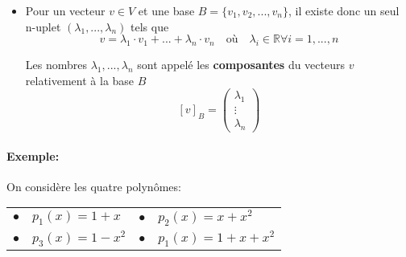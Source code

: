 \documentclass[
    11pt,
    a4paper,
    oneside,
    headinlcude, footinclude,
    twoside,
]{report}
\newcommand{\myVector}[3]{\begin{pmatrix}#1\\#2\\#3\end{pmatrix}}
\begin{document}
\begin{itemize}
    \item Pour un vecteur $v \in V $ et une base $ B = \{v_{1}, v_{2}, ..., v_{n}\}$,
        il existe donc un seul n-uplet $(\lambda_{1}, ..., \lambda_{n})$ tels
        que 
        $$v = \lambda_{1} \cdot v_{1} + ... + \lambda_{n}\cdot v_{n} \quad \text{où}
        \quad \lambda_{i} \in \mathbb{R} \forall i = 1, ..., n$$

        Les nombres $\lambda_{1}, ..., \lambda_{n}$ sont appelé les \textbf{composantes} du
        vecteurs $v$ relativement à la base $B$ $$[v]_{B} = \myVector
        {\lambda_{1}}{\vdots}{\lambda_{n}}$$
\end{itemize}

\paragraph{Exemple:}

On considère les quatre polynômes:

\begin{center}
    \begin{tabular}{ll}
        $\bullet \quad p_{1}(x) = 1 + x$ & $\bullet \quad p_{2}(x) = x + x^{2}$\\
        $\bullet \quad p_{3}(x) = 1 - x^{2}$ & $\bullet \quad p_{1}(x) = 1 + x + x^{2}$\\
    \end{tabular}
\end{center}
\end{document}
